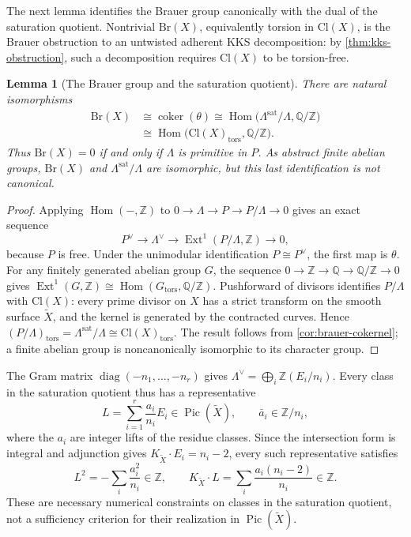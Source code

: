\documentclass[11pt]{article}
\theoremstyle{plain}
\newtheorem{lemma}[lemma]{Lemma}
\theoremstyle{definition}
\theoremstyle{remark}
\newcommand{\Z}{\mathbb Z}
\newcommand{\Pic}{\operatorname{Pic}}
\newcommand{\Hom}{\operatorname{Hom}}
\newcommand{\Ext}{\operatorname{Ext}}
\newcommand{\Cl}{\mathrm{Cl}}
\newcommand{\Br}{\mathrm{Br}}
\begin{document}
The next lemma identifies the Brauer group canonically with the dual of
the saturation quotient. Nontrivial \(\Br(X)\), equivalently torsion in
\(\Cl(X)\), is the Brauer obstruction to an untwisted adherent KKS
decomposition: by \cref{thm:kks-obstruction}, such a decomposition requires
\(\Cl(X)\) to be torsion-free.

\begin{lemma}[The Brauer group and the saturation quotient]\label{lem:brauer-glue-duality}
There are natural isomorphisms
\[
\begin{aligned}
\Br(X)&\cong\operatorname{coker}(\theta)
\cong\Hom\bigl(\Lambda^{\mathrm{sat}}/\Lambda,\mathbb Q/\Z\bigr)\\
&\cong\Hom\bigl(\Cl(X)_{\mathrm{tors}},\mathbb Q/\Z\bigr).
\end{aligned}
\]
Thus \(\Br(X)=0\) if and only if \(\Lambda\) is primitive in \(P\).
As abstract finite abelian groups, \(\Br(X)\) and
\(\Lambda^{\mathrm{sat}}/\Lambda\) are isomorphic, but this last
identification is not canonical.
\end{lemma}

\begin{proof}
Applying \(\Hom(-,\Z)\) to \(0\to\Lambda\to P\to P/\Lambda\to0\)
gives an exact sequence
\[
P^\vee\longrightarrow\Lambda^\vee
\longrightarrow\Ext^1(P/\Lambda,\Z)\longrightarrow0,
\]
because \(P\) is free. Under the unimodular identification
\(P\cong P^\vee\), the first map is \(\theta\). For any finitely
generated abelian group \(G\), the sequence
\(0\to\Z\to\mathbb Q\to\mathbb Q/\Z\to0\) gives
\(\Ext^1(G,\Z)\cong\Hom(G_{\mathrm{tors}},\mathbb Q/\Z)\).
Pushforward of divisors identifies \(P/\Lambda\) with \(\Cl(X)\):
every prime divisor on \(X\) has a strict transform on the smooth
surface \(\widetilde X\), and the kernel is generated by the contracted
curves. Hence
\((P/\Lambda)_{\mathrm{tors}}=\Lambda^{\mathrm{sat}}/\Lambda
\cong\Cl(X)_{\mathrm{tors}}\).
The result follows from \cref{cor:brauer-cokernel}; a finite abelian
group is noncanonically isomorphic to its character group.
\end{proof}

The Gram matrix \(\operatorname{diag}(-n_1,\ldots,-n_r)\) gives
\(\Lambda^\vee=\bigoplus_i\Z(E_i/n_i)\). Every class in the saturation quotient thus
has a representative
\[
L=\sum_{i=1}^r\frac{a_i}{n_i}E_i\in\Pic(\widetilde X),
\qquad \bar a_i\in\Z/n_i,
\]
where the \(a_i\) are integer lifts of the residue classes. Since
the intersection form is integral and adjunction gives
\(K_{\widetilde X}\cdot E_i=n_i-2\), every such representative
satisfies
\begin{equation}\label{eq:mixed-glue-integrality}
L^2=-\sum_i\frac{a_i^2}{n_i}\in\Z,
\qquad
K_{\widetilde X}\cdot L=
\sum_i\frac{a_i(n_i-2)}{n_i}\in\Z.
\end{equation}
These are necessary numerical constraints on classes in the saturation quotient, not a
sufficiency criterion for their realization in \(\Pic(\widetilde X)\).
\end{document}
